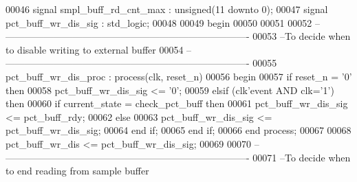 \begin{DoxyCode}
00046 \textcolor{keywordflow}{signal} \textcolor{vhdlchar}{smpl_buff_rd_cnt_max}      \textcolor{vhdlchar}{:} \textcolor{comment}{unsigned}\textcolor{vhdlchar}{(}\textcolor{vhdllogic}{}\textcolor{vhdllogic}{11} \textcolor{keywordflow}{downto} \textcolor{vhdllogic}{}\textcolor{vhdllogic}{0}\textcolor{vhdlchar}{)};
00047 \textcolor{keywordflow}{signal} \textcolor{vhdlchar}{pct_buff_wr_dis_sig}       \textcolor{vhdlchar}{:} \textcolor{comment}{std\_logic};
00048   
00049 \textcolor{vhdlkeyword}{begin}
00050 
00051 
00052 \textcolor{keyword}{-- ----------------------------------------------------------------------------}
00053 \textcolor{keyword}{--To decide when to disable writing to external buffer}
00054 \textcolor{keyword}{-- ----------------------------------------------------------------------------}
00055 pct\_buff\_wr\_dis\_proc : \textcolor{keywordflow}{process}(clk, reset_n)
00056 \textcolor{vhdlkeyword}{begin}
00057    \textcolor{keywordflow}{if} \textcolor{vhdlchar}{reset_n} \textcolor{vhdlchar}{=} \textcolor{vhdlchar}{'}\textcolor{vhdllogic}{}\textcolor{vhdllogic}{0}\textcolor{vhdlchar}{'} \textcolor{keywordflow}{then} 
00058       \textcolor{vhdlchar}{pct_buff_wr_dis_sig} \textcolor{vhdlchar}{<=} \textcolor{vhdlchar}{'}\textcolor{vhdllogic}{}\textcolor{vhdllogic}{0}\textcolor{vhdlchar}{'};
00059    \textcolor{keywordflow}{elsif} \textcolor{vhdlchar}{(}\textcolor{vhdlchar}{clk}\textcolor{vhdlchar}{'}\textcolor{vhdlkeyword}{event} \textcolor{keywordflow}{AND} \textcolor{vhdlchar}{clk}\textcolor{vhdlchar}{=}\textcolor{vhdlchar}{'}\textcolor{vhdllogic}{}\textcolor{vhdllogic}{1}\textcolor{vhdlchar}{'}\textcolor{vhdlchar}{)} \textcolor{keywordflow}{then} 
00060       \textcolor{keywordflow}{if} \textcolor{vhdlchar}{current_state} \textcolor{vhdlchar}{=} \textcolor{vhdlchar}{check\_pct\_buff} \textcolor{keywordflow}{then}
00061          \textcolor{vhdlchar}{pct_buff_wr_dis_sig} \textcolor{vhdlchar}{<=} \textcolor{vhdlchar}{pct_buff_rdy};
00062       \textcolor{keywordflow}{else} 
00063          \textcolor{vhdlchar}{pct_buff_wr_dis_sig} \textcolor{vhdlchar}{<=} \textcolor{vhdlchar}{pct_buff_wr_dis_sig};
00064       \textcolor{keywordflow}{end} \textcolor{keywordflow}{if};
00065    \textcolor{keywordflow}{end} \textcolor{keywordflow}{if};
00066 \textcolor{keywordflow}{end} \textcolor{keywordflow}{process};
00067 
00068 \textcolor{vhdlchar}{pct_buff_wr_dis} \textcolor{vhdlchar}{<=} \textcolor{vhdlchar}{pct_buff_wr_dis_sig};
00069 
00070 \textcolor{keyword}{-- ----------------------------------------------------------------------------}
00071 \textcolor{keyword}{--To decide when to end reading from sample buffer}

\end{DoxyCode}
